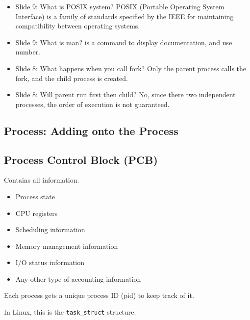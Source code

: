 \begin{faq}
\begin{itemize}
        \item Slide 9: What is POSIX system? POSIX (Portable Operating System Interface) is a family of standards specified by the IEEE for maintaining compatibility between operating systems.
        \item Slide 9: What is man? is a command to display documentation, and use number. 
        \item Slide 8: What happens when you call fork? Only the parent process calls the fork, and the child process is created. 
        \item Slide 8: Will parent run first then child? No, since there two independent processes, the order of execution is not guaranteed.
    \end{itemize}
\end{faq}

\subsection{Process: Adding onto the Process}
\begin{definition}
\end{definition}

\subsection{Process Control Block (PCB)}
\begin{definition}
    Contains all information.
    \begin{itemize}
        \item Process state
        \item CPU registers
        \item Scheduling information
        \item Memory management information
        \item I/O status information
        \item Any other type of accounting information
    \end{itemize}    
\end{definition}

\begin{warning}
    Each process gets a unique process ID (pid) to keep track of it.     
\end{warning}

\begin{example}
    In Linux, this is the \texttt{task\_struct} structure.
\end{example}

